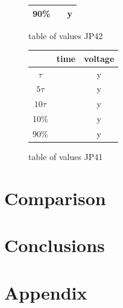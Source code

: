 \documentclass[notitlepage, a4paper, 11pt]{article}
\begin{document}
\begin{figure}[H]
\begin{subtable}{0.3\textwidth}
\begin{tabular}{|c|c|c|}
				\hline
				90\% & & y \\
				\hline
			\end{tabular}
			\caption{table of values JP42}
		\end{subtable}
		\hfill
		\begin{subtable}{0.3\textwidth}
			\centering
			\begin{tabular}{|c|c|c|}
				\hline
				& time & voltage \\
				\hline
				$\tau$ & & y \\
				\hline		
				$5\tau$ & & y \\
				\hline
				$10\tau$ & & y \\
				\hline
				10\% & & y \\
				\hline
				90\% & & y \\
				\hline
			\end{tabular}
			\caption{table of values JP41}
		\end{subtable}
	\end{figure}
	
	\section{Comparison}
	\section{Conclusions}
	
	\newpage
	\appendix
	\section{Appendix}\label{sec:appendix}
\end{document}
